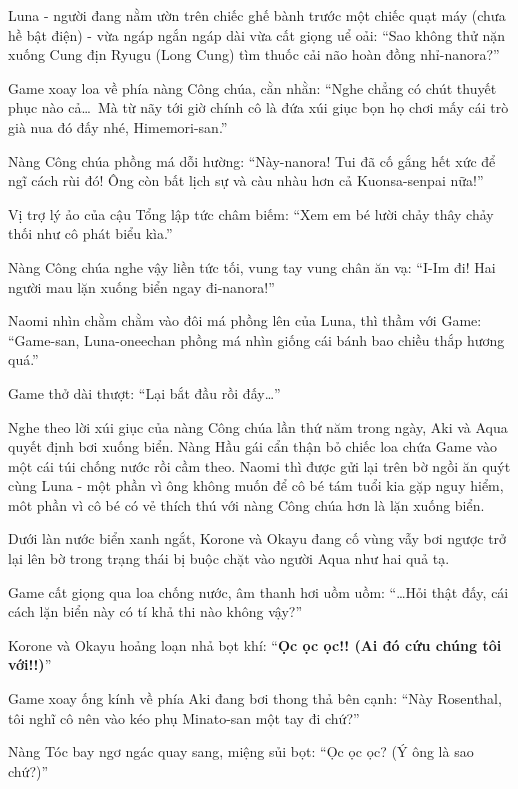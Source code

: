 \documentclass[../main.tex]{subfiles}
\begin{document}
Luna - người đang nằm ườn trên chiếc ghế bành trước một chiếc quạt máy (chưa hề bật điện) - vừa ngáp ngắn ngáp dài vừa cất giọng uể oải: ``Sao không thử nặn xuống Cung địn Ryugu (Long Cung) tìm thuốc cải não hoàn đồng nhỉ-nanora?''


Game xoay loa về phía nàng Công chúa, cằn nhằn: ``Nghe chẳng có chút thuyết phục nào cả\dots\ Mà từ nãy tới giờ chính cô là đứa xúi giục bọn họ chơi mấy cái trò già nua đó đấy nhé, Himemori-san.''

Nàng Công chúa phồng má dỗi hường: ``Này-nanora! Tui đã cố gắng hết xức để ngĩ cách rùi đó! Ông còn bất lịch sự và càu nhàu hơn cả Kuonsa-senpai nữa!''

Vị trợ lý ảo của cậu Tổng lập tức châm biếm: ``Xem em bé lười chảy thây chảy thối như cô phát biểu kìa.''

Nàng Công chúa nghe vậy liền tức tối, vung tay vung chân ăn vạ: ``I-Im đi! Hai người mau lặn xuống biển ngay đi-nanora!''

Naomi nhìn chằm chằm vào đôi má phồng lên của Luna, thì thầm với Game: ``Game-san, Luna-oneechan phồng má nhìn giống cái bánh bao chiều thắp hương quá.''

Game thở dài thượt: ``Lại bắt đầu rồi đấy\dots''

\ct

Nghe theo lời xúi giục của nàng Công chúa lần thứ năm trong ngày, Aki và Aqua quyết định bơi xuống biển. Nàng Hầu gái cẩn thận bỏ chiếc loa chứa Game vào một cái túi chống nước rồi cầm theo. Naomi thì được gửi lại trên bờ ngồi ăn quýt cùng Luna - một phần vì ông không muốn để cô bé tám tuổi kia gặp nguy hiểm, môt phần vì cô bé có vẻ thích thú với nàng Công chúa hơn là lặn xuống biển.


Dưới làn nước biển xanh ngắt, Korone và Okayu đang cố vùng vẫy bơi ngược trở lại lên bờ trong trạng thái bị buộc chặt vào người Aqua như hai quả tạ.

Game cất giọng qua loa chống nước, âm thanh hơi uồm uồm: ``\dots Hỏi thật đấy, cái cách lặn biển này có tí khả thi nào không vậy?''

Korone và Okayu hoảng loạn nhả bọt khí: ``\textbf{Ọc ọc ọc!! (Ai đó cứu chúng tôi với!!)}''

Game xoay ống kính về phía Aki đang bơi thong thả bên cạnh: ``Này Rosenthal, tôi nghĩ cô nên vào kéo phụ Minato-san một tay đi chứ?''

Nàng Tóc bay ngơ ngác quay sang, miệng sủi bọt: ``Ọc ọc ọc? (Ý ông là sao chứ?)''
\end{document}
